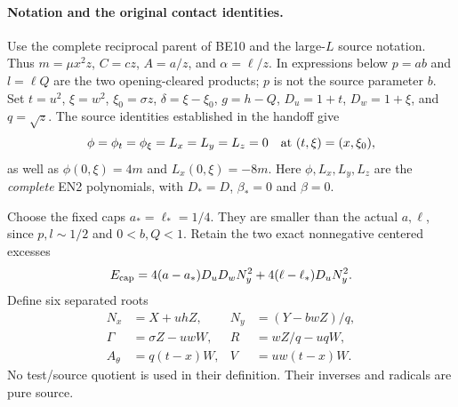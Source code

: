 \paragraph{Notation and the original contact identities.}
Use the complete reciprocal parent of BE10 and the large-$L$ source
notation. Thus $m=\mu x^2z$, $C=cz$, $A=a/z$, and
$\alpha=\ell/z$. In expressions below $p=ab$ and $l=\ell Q$ are
the two opening-cleared products; $p$ is not the source parameter $b$.
Set $t=u^2$, $\xi=w^2$, $\xi_0=\sigma z$, $\delta=\xi-\xi_0$,
$g=h-Q$, $D_u=1+t$, $D_w=1+\xi$, and $q=\sqrt z$.
The source identities established in the handoff give
\[
 \phi=\phi_t=\phi_\xi=L_x=L_y=L_z=0
 \quad\hbox{at }(t,\xi)=(x,\xi_0),
\]
as well as $\phi(0,\xi)=4m$ and $L_x(0,\xi)=-8m$.
Here $\phi,L_x,L_y,L_z$ are the \emph{complete} EN2 polynomials,
with $D_*=D$, $\beta_*=0$ and $\beta=0$.

Choose the fixed caps $a_* = \ell_* =1/4$. They are smaller than
the actual $a,\ell$, since $p,l\sim1/2$ and $0<b,Q<1$.
Retain the two exact nonnegative centered excesses
\[
 E_{\rm cap}=4(a-a_*)D_uD_wN_y^2+4(\ell-\ell_*)D_uN_y^2.
\]
Define six separated roots
\[
\begin{aligned}
N_x&=X+uhZ,&N_y&=(Y-bwZ)/q,\\
\Gamma&=\sigma Z-uwW,&R&=wZ/q-uqW,\\
A_\theta&=q(t-x)W,&V&=uw(t-x)W.
\end{aligned}\tag{JR1}
\]
No test/source quotient is used in their definition. Their inverses
and radicals are pure source.

